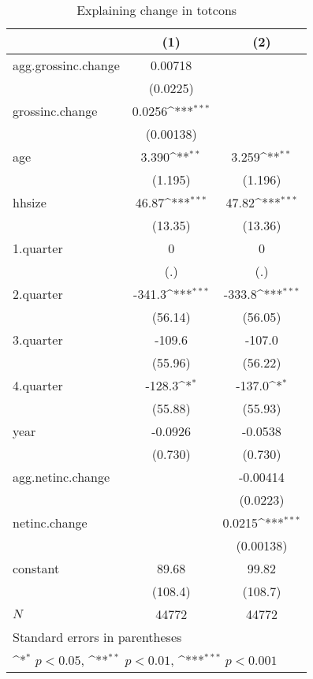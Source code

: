 \begin{table}[htbp]\centering
\def\sym#1{\ifmmode^{#1}\else\(^{#1}\)\fi}
\caption{\label{tab:totcons-deltainc} Explaining change in totcons}
\begin{tabular}{l*{2}{c}}
\hline\hline
            &\multicolumn{1}{c}{(1)}         &\multicolumn{1}{c}{(2)}         \\
\hline
agg.grossinc.change&     0.00718         &                     \\
            &    (0.0225)         &                     \\
grossinc.change&      0.0256\sym{***}&                     \\
            &   (0.00138)         &                     \\
age         &       3.390\sym{**} &       3.259\sym{**} \\
            &     (1.195)         &     (1.196)         \\
hhsize      &       46.87\sym{***}&       47.82\sym{***}\\
            &     (13.35)         &     (13.36)         \\
1.quarter   &           0         &           0         \\
            &         (.)         &         (.)         \\
2.quarter   &      -341.3\sym{***}&      -333.8\sym{***}\\
            &     (56.14)         &     (56.05)         \\
3.quarter   &      -109.6         &      -107.0         \\
            &     (55.96)         &     (56.22)         \\
4.quarter   &      -128.3\sym{*}  &      -137.0\sym{*}  \\
            &     (55.88)         &     (55.93)         \\
year        &     -0.0926         &     -0.0538         \\
            &     (0.730)         &     (0.730)         \\
agg.netinc.change&                     &    -0.00414         \\
            &                     &    (0.0223)         \\
netinc.change&                     &      0.0215\sym{***}\\
            &                     &   (0.00138)         \\
constant    &       89.68         &       99.82         \\
            &     (108.4)         &     (108.7)         \\
\hline
\(N\)       &       44772         &       44772         \\
\hline\hline
\multicolumn{3}{l}{\footnotesize Standard errors in parentheses}\\
\multicolumn{3}{l}{\footnotesize \sym{*} \(p<0.05\), \sym{**} \(p<0.01\), \sym{***} \(p<0.001\)}\\
\end{tabular}
\end{table}
